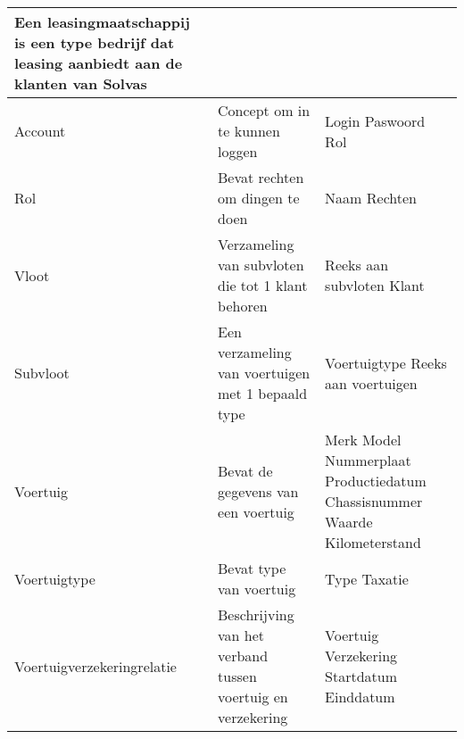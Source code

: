 \documentclass{article}
\begin{document}
\begin{tabularx}{\textwidth}{ | l | X |X|}
 Een leasingmaatschappij is een type bedrijf dat leasing aanbiedt aan de klanten van Solvas &
 \\
 \hline
 
 Account & 

 Concept om in te kunnen loggen  &
 
 Login\newline
 Paswoord\newline
 Rol\\
 \hline
 
 Rol & 

 Bevat rechten om dingen te doen &
 
 Naam\newline
 Rechten\\
 \hline
 
 Vloot & 

 Verzameling van subvloten die tot 1 klant behoren &
 
 Reeks aan subvloten\newline
 Klant\\
 \hline
 
 Subvloot & 

 Een verzameling van voertuigen met 1 bepaald type &
 
 Voertuigtype\newline
 Reeks aan voertuigen\\
 \hline
 
 Voertuig & 

 Bevat de gegevens van een voertuig &
 
 Merk\newline
 Model\newline
 Nummerplaat\newline
 Productiedatum\newline
 Chassisnummer\newline
 Waarde\newline
 Kilometerstand\\
 \hline
 
 Voertuigtype & 

 Bevat type van voertuig &
 
 Type\newline
 Taxatie\\
 \hline
 
 Voertuigverzekeringrelatie & 
 
 Beschrijving van het verband tussen voertuig en verzekering & 
 
 Voertuig\newline
 Verzekering\newline
 Startdatum\newline
 Einddatum\\
 \hline
 

\end{tabularx}
\end{document}
